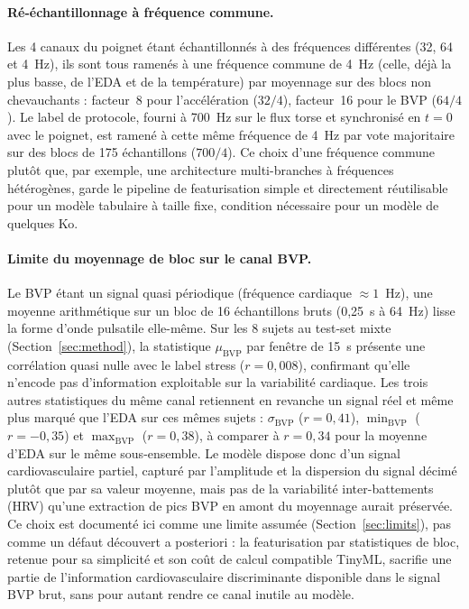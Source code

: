 \documentclass{acmart}
\begin{document}
\paragraph{Ré-échantillonnage à fréquence commune.} Les 4 canaux du poignet
étant échantillonnés à des fréquences différentes (32, 64 et 4~Hz), ils sont
tous ramenés à une fréquence commune de 4~Hz (celle, déjà la plus basse, de
l'EDA et de la température) par moyennage sur des blocs non chevauchants :
facteur~8 pour l'accélération ($32/4$), facteur~16 pour le BVP ($64/4$). Le
label de protocole, fourni à 700~Hz sur le flux torse et synchronisé en
$t=0$ avec le poignet, est ramené à cette même fréquence de 4~Hz par vote
majoritaire sur des blocs de 175 échantillons ($700/4$). Ce choix d'une
fréquence commune plutôt que, par exemple, une architecture multi-branches à
fréquences hétérogènes, garde le pipeline de featurisation simple et
directement réutilisable pour un modèle tabulaire à taille fixe, condition
nécessaire pour un modèle de quelques Ko.

\paragraph{Limite du moyennage de bloc sur le canal BVP.} Le BVP étant un
signal quasi périodique (fréquence cardiaque $\approx 1$~Hz), une moyenne
arithmétique sur un bloc de 16 échantillons bruts (0,25~s à 64~Hz) lisse la
forme d'onde pulsatile elle-même. Sur les 8 sujets au test-set mixte
(Section~\ref{sec:method}), la statistique $\mu_{\text{BVP}}$ par fenêtre de
15~s présente une corrélation quasi nulle avec le label stress
($r = 0{,}008$), confirmant qu'elle n'encode pas d'information exploitable
sur la variabilité cardiaque. Les trois autres statistiques du même canal
retiennent en revanche un signal réel et même plus marqué que l'EDA sur ces
mêmes sujets : $\sigma_{\text{BVP}}$ ($r=0{,}41$), $\min_{\text{BVP}}$
($r=-0{,}35$) et $\max_{\text{BVP}}$ ($r=0{,}38$), à comparer à
$r=0{,}34$ pour la moyenne d'EDA sur le même sous-ensemble. Le modèle
dispose donc d'un signal cardiovasculaire partiel, capturé par l'amplitude
et la dispersion du signal décimé plutôt que par sa valeur moyenne, mais
pas de la variabilité inter-battements (HRV) qu'une extraction de pics BVP
en amont du moyennage aurait préservée. Ce choix est documenté ici comme une
limite assumée (Section~\ref{sec:limits}), pas comme un défaut découvert a
posteriori : la featurisation par statistiques de bloc, retenue pour sa
simplicité et son coût de calcul compatible TinyML, sacrifie une partie de
l'information cardiovasculaire discriminante disponible dans le signal BVP
brut, sans pour autant rendre ce canal inutile au modèle.
\end{document}
